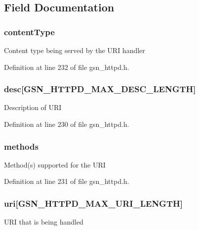 \subsection{Field Documentation}
\hypertarget{a00097_ad528c260b261812c469bf838902b01bf}{
\subsubsection[{contentType}]{ {\bf contentType}}}
\label{a00097_ad528c260b261812c469bf838902b01bf}
Content type being served by the URI handler 

Definition at line 232 of file gsn\_\-httpd.h.

\hypertarget{a00097_a6d9946120691f74b3172239aefadfea2}{
\subsubsection[{desc}]{ {\bf desc}\mbox{[}GSN\_\-HTTPD\_\-MAX\_\-DESC\_\-LENGTH\mbox{]}}}
\label{a00097_a6d9946120691f74b3172239aefadfea2}
Description of URI 

Definition at line 230 of file gsn\_\-httpd.h.

\hypertarget{a00097_ad3a8760dd52aef4c629a6c6ee61e4017}{
\subsubsection[{methods}]{ {\bf methods}}}
\label{a00097_ad3a8760dd52aef4c629a6c6ee61e4017}
Method(s) supported for the URI 

Definition at line 231 of file gsn\_\-httpd.h.

\hypertarget{a00097_a28a8e8ca2b3ff3e8a7ea486b4ee4cc10}{
\subsubsection[{uri}]{ {\bf uri}\mbox{[}GSN\_\-HTTPD\_\-MAX\_\-URI\_\-LENGTH\mbox{]}}}
\label{a00097_a28a8e8ca2b3ff3e8a7ea486b4ee4cc10}
URI that is being handled 

